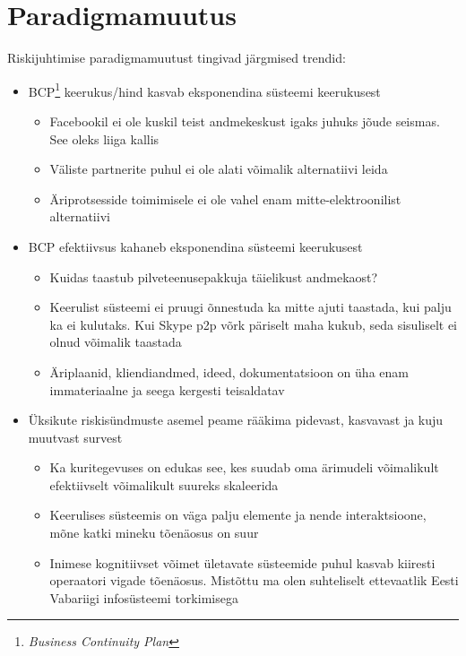 \documentclass{tufte-book}
\begin{document}
\section{Paradigmamuutus}
Riskijuhtimise paradigmamuutust tingivad järgmised trendid:
	\begin{itemize}
		\item BCP\footnote{\emph{Business Continuity Plan}} keerukus/hind kasvab eksponendina süsteemi keerukusest
			\begin{itemize}
		\item Facebookil ei ole kuskil teist andmekeskust igaks juhuks jõude seismas. See oleks liiga kallis
		\item Väliste partnerite puhul ei ole alati võimalik alternatiivi leida
		\item Äriprotsesside toimimisele ei ole vahel enam mitte-elektroonilist alternatiivi
	\end{itemize}

		\item BCP efektiivsus kahaneb eksponendina süsteemi keerukusest
			\begin{itemize}
		\item Kuidas taastub pilveteenusepakkuja täielikust andmekaost?
		\item Keerulist süsteemi ei pruugi õnnestuda ka mitte ajuti taastada, kui palju ka ei kulutaks. Kui Skype p2p võrk päriselt maha kukub, seda sisuliselt ei olnud võimalik taastada
		\item Äriplaanid, kliendiandmed, ideed, dokumentatsioon on üha enam immateriaalne ja seega kergesti teisaldatav
	\end{itemize}

		\item Üksikute riskisündmuste asemel peame rääkima pidevast, kasvavast ja kuju muutvast survest
			\begin{itemize}
		\item Ka kuritegevuses on edukas see, kes suudab oma ärimudeli võimalikult efektiivselt võimalikult suureks skaleerida
		\item Keerulises süsteemis on väga palju elemente ja nende interaktsioone, mõne katki mineku tõenäosus on suur
		\item Inimese kognitiivset võimet ületavate süsteemide puhul kasvab kiiresti operaatori vigade tõenäosus. Mistõttu ma olen suhteliselt ettevaatlik Eesti Vabariigi infosüsteemi torkimisega
	\end{itemize}


\end{itemize}
\end{document}
